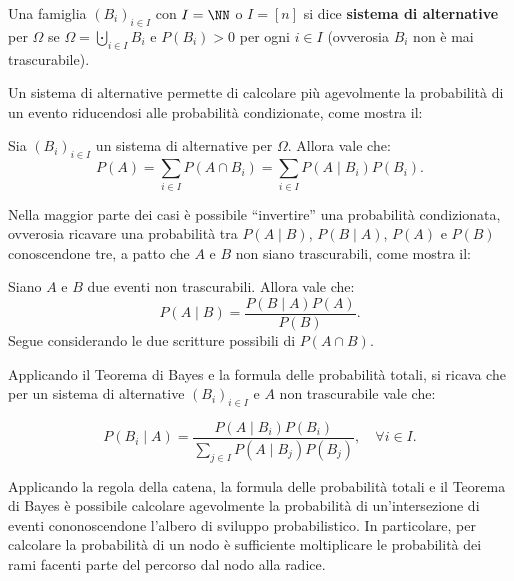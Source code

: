 \begin{multicols*}{2}
    \begin{definition}
        Una famiglia $(B_i)_{i \in I}$ con $I = \NN$ o
        $I = [n]$ si dice \textbf{sistema di alternative}
        per $\Omega$ se $\Omega = \bigcupdot_{i \in I} B_i$
        e $P(B_i) > 0$ per ogni $i \in I$ (ovverosia
        $B_i$ non è mai trascurabile).
    \end{definition}

    Un sistema di alternative permette di calcolare più agevolmente
    la probabilità di un evento riducendosi alle probabilità
    condizionate, come mostra il:

    \begin{lemma}
        Sia $(B_i)_{i \in I}$ un sistema di alternative per $\Omega$. Allora vale
        che:
        \[ 
            P(A) = \sum_{i \in I} P(A \cap B_i) = \sum_{i \in I} P(A \mid B_i) P(B_i).
        \]
    \end{lemma}

    Nella maggior parte dei casi è possibile ``invertire'' una probabilità
    condizionata, ovverosia ricavare una probabilità tra $P(A \mid B)$,
    $P(B \mid A)$, $P(A)$ e $P(B)$ conoscendone tre, a patto che
    $A$ e $B$ non siano trascurabili, come mostra il:

    \begin{theorem}[di Bayes]
        Siano $A$ e $B$ due eventi non trascurabili. Allora vale che:
        \[
            P(A \mid B) = \frac{P(B \mid A) P(A)}{P(B)}.
        \]
        Segue considerando le due scritture possibili di $P(A \cap B)$.
    \end{theorem}

    \begin{remark}
        Applicando il Teorema di Bayes e la formula delle probabilità totali,
        si ricava che per un sistema di alternative $(B_i)_{i \in I}$ e
        $A$ non trascurabile vale che:

        \[
            P(B_i \mid A) = \frac{P(A \mid B_i) P(B_i)}{\sum_{j \in I} P(A \mid B_j) P(B_j)}, \quad \forall i \in I.
        \]
    \end{remark}

    \begin{remark}
        Applicando la regola della catena, la formula delle probabilità totali
        e il Teorema di Bayes è possibile calcolare agevolmente la probabilità
        di un'intersezione di eventi cononoscendone l'albero di sviluppo probabilistico.
        In particolare, per calcolare la probabilità di un nodo è sufficiente
        moltiplicare le probabilità dei rami facenti parte del percorso dal nodo
        alla radice.
    \end{remark}


\end{multicols*}

